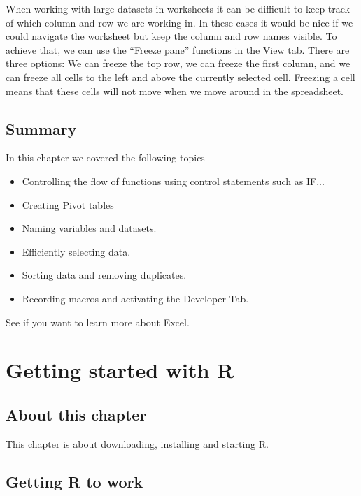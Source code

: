 \documentclass[]{book}
\providecommand{\tightlist}{%
  \setlength{\itemsep}{0pt}\setlength{\parskip}{0pt}}
\begin{document}
When working with large datasets in worksheets it can be difficult to keep track of which column and row we are working in. In these cases it would be nice if we could navigate the worksheet but keep the column and row names visible. To achieve that, we can use the ``Freeze pane'' functions in the View tab. There are three options: We can freeze the top row, we can freeze the first column, and we can freeze all cells to the left and above the currently selected cell. Freezing a cell means that these cells will not move when we move around in the spreadsheet.

\hypertarget{summary-13}{%
\section{Summary}\label{summary-13}}

In this chapter we covered the following topics

\begin{itemize}
\tightlist
\item
  Controlling the flow of functions using control statements such as IF...
\item
  Creating Pivot tables
\item
  Naming variables and datasets.
\item
  Efficiently selecting data.
\item
  Sorting data and removing duplicates.
\item
  Recording macros and activating the Developer Tab.
\end{itemize}

See \citep{bible} if you want to learn more about Excel.

\hypertarget{getting-started-with-r}{%
\chapter{Getting started with R}\label{getting-started-with-r}}

\hypertarget{about-this-chapter-13}{%
\section{About this chapter}\label{about-this-chapter-13}}

This chapter is about downloading, installing and starting R.

\hypertarget{getting-r-to-work}{%
\section{Getting R to work}\label{getting-r-to-work}}
\end{document}
